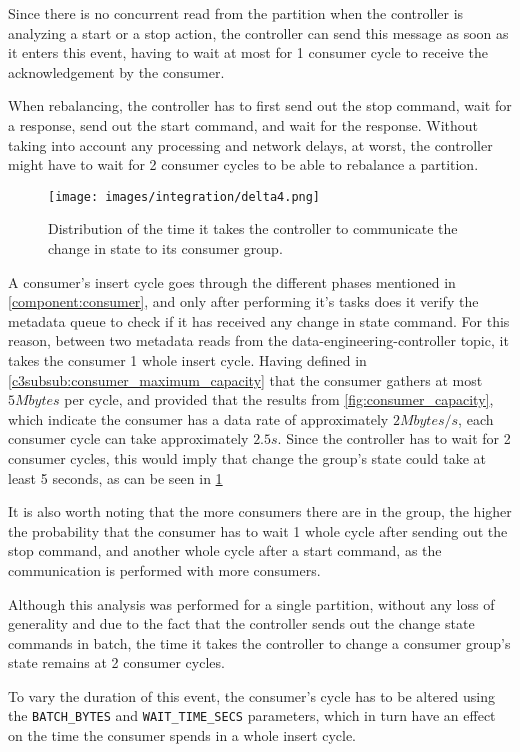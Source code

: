 Since there is no concurrent read from the partition when the controller is analyzing a start or a stop action, the controller can send this message as soon as it enters this event, having to wait at most for 1 consumer cycle to receive the acknowledgement by the consumer. 

When rebalancing, the controller has to first send out the stop command, wait for a response, send out the start command, and wait for the response. Without taking into account any processing and network delays, at worst, the controller might have to wait for 2 consumer cycles to be able to rebalance a partition.

\begin{figure}[H]
    \centering
    \texttt{[image: images/integration/delta4.png]}
\caption{Distribution of the time it takes the controller to communicate the change in state to its consumer group.}
\label{fig:controller_result_change_state}
\end{figure}

A consumer's insert cycle goes through the different phases mentioned in \ref{component:consumer}, and only after performing it's tasks does it verify the metadata queue to check if it has received any change in state command. For this reason, between two metadata reads from the data-engineering-controller topic, it takes the consumer 1 whole insert cycle. Having defined in \ref{c3subsub:consumer_maximum_capacity} that the consumer gathers at most $5Mbytes$ per cycle, and provided that the results from \ref{fig:consumer_capacity}, which indicate the consumer has a data rate of approximately $2Mbytes/s$, each consumer cycle can take approximately $2.5s$. Since the controller has to wait for 2 consumer cycles, this would imply that change the group's state could take at least 5 seconds, as can be seen in \ref{fig:controller_result_change_state}

It is also worth noting that the more consumers there are in the group, the higher the probability that the consumer has to wait 1 whole cycle after sending out the stop command, and another whole cycle after a start command, as the communication is performed with more consumers.

Although this analysis was performed for a single partition, without any loss of generality and due to the fact that the controller sends out the change state commands in batch, the time it takes the controller to change a consumer group's state remains at 2 consumer cycles.

To vary the duration of this event, the consumer's cycle has to be altered using the \lstinline[language=Python]{BATCH_BYTES} and \lstinline[language=Python]{WAIT_TIME_SECS} parameters, which in turn have an effect on the time the consumer spends in a whole insert cycle.
